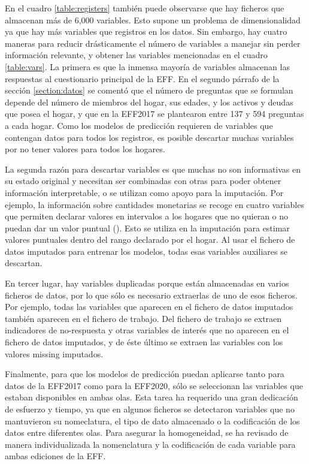 En el cuadro \ref{table:registers} también puede observarse que hay ficheros que almacenan más de 6,000 variables. Esto supone un problema de dimensionalidad ya que hay más variables que registros en los datos. Sin embargo, hay cuatro maneras para reducir drásticamente el número de variables a manejar sin perder información relevante, y obtener las variables mencionadas en el cuadro \ref{table:vars}. La primera es que la inmensa mayoría de variables almacenan las respuestas al cuestionario principal de la EFF. En el segundo párrafo de la sección \ref{section:datos} se comentó que el número de preguntas que se formulan depende del número de miembros del hogar, sus edades, y los activos y deudas que posea el hogar, y que en la EFF2017 se plantearon entre 137 y 594 preguntas a cada hogar. Como los modelos de predicción requieren de variables que contengan datos para todos los registros, es posible descartar muchas variables por no tener valores para todos los hogares.

La segunda razón para descartar variables es que muchas no son informativas en su estado original y necesitan ser combinadas con otras para poder obtener información interpretable, o se utilizan como apoyo para la imputación. Por ejemplo, la información sobre cantidades monetarias se recoge en cuatro variables que permiten declarar valores en intervalos a los hogares que no quieran o no puedan dar un valor puntual (\cite{effmethod2017}). Esto se utiliza en la imputación para estimar valores puntuales dentro del rango declarado por el hogar. Al usar el fichero de datos imputados para entrenar los modelos, todas esas variables auxiliares se descartan.

En tercer lugar, hay variables duplicadas porque están almacenadas en varios ficheros de datos, por lo que sólo es necesario extraerlas de uno de esos ficheros. Por ejemplo, todas las variables que aparecen en el fichero de datos imputados también aparecen en el fichero de trabajo. Del fichero de trabajo se extraen indicadores de no-respuesta y otras variables de interés que no aparecen en el fichero de datos imputados, y de éste último se extraen las variables con los valores missing imputados.

Finalmente, para que los modelos de predicción puedan aplicarse tanto para datos de la EFF2017 como para la EFF2020, sólo se seleccionan las variables que estaban disponibles en ambas olas. Esta tarea ha requerido una gran dedicación de esfuerzo y tiempo, ya que en algunos ficheros se detectaron variables que no mantuvieron su nomeclatura, el tipo de dato almacenado o la codificación de los datos entre diferentes olas. Para asegurar la homogeneidad, se ha revisado de manera individualizada la nomenclatura y la codificación de cada variable para ambas ediciones de la EFF.

